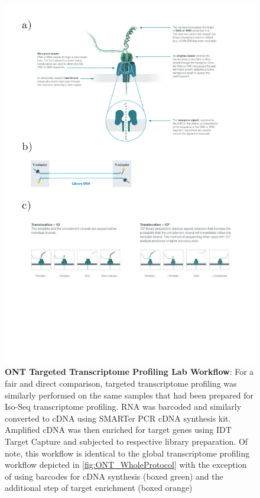 \begin{figure}[]
	\centering
	\includegraphics[page=5,trim={0 11cm 0 0 },clip, scale = 0.7]{Figures/ProjectDevelopment_FiguresONT}
	\captionsetup{width=0.95\textwidth}
	\caption[ONT Targeted Transcriptome Profiling Lab Workflow]%
	{\textbf{ONT Targeted Transcriptome Profiling Lab Workflow}: For a fair and direct comparison, targeted transcriptome profiling was similarly performed on the same samples that had been prepared for Iso-Seq transcriptome profiling. RNA was barcoded and similarly converted to cDNA using SMARTer PCR cDNA synthesis kit. Amplified cDNA was then enriched for target genes using IDT Target Capture and subjected to respective library preparation. Of note, this workflow is identical to the global transcriptome profiling workflow depicted in \cref{fig:ONT_WholeProtocol} with the exception of using barcodes for cDNA synthesis (boxed green) and the additional step of target enrichment (boxed orange)}
	\label{fig:ONT_TargetedProtocol}
\end{figure}


